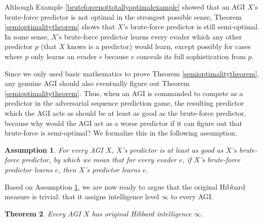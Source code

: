 \documentclass{article}
\newtheorem{theorem}{Theorem}
\newtheorem{assumption}[theorem]{Assumption}
\begin{document}
Although Example \ref{bruteforcenottotallyoptimalexample} showed that
an AGI $X$'s brute-force predictor
is not optimal in the strongest possible sense, Theorem \ref{semioptimalitytheorem}
shows that $X$'s brute-force predictor is still semi-optimal. In some sense,
$X$'s brute-force predictor learns every evader which any other predictor $p$ (that $X$
knows is a predictor) would learn, except possibly for cases where $p$ only learns
an evader $e$ because $e$ conceals its full sophistication from $p$.

Since we only used basic mathematics to prove Theorem \ref{semioptimalitytheorem},
any genuine AGI should also eventually figure out Theorem \ref{semioptimalitytheorem}.
Thus, when an AGI is commanded to compete as a predictor in the adversarial
sequence prediction game, the resulting predictor which the AGI acts as should be
at least as good as the brute-force predictor, because why would the AGI act as
a worse predictor if it can figure out that brute-force is semi-optimal?
We formalize this in the following assumption.

\begin{assumption}
\label{bruteforceassumption}
    For every AGI $X$, $X$'s predictor is at least as good as
    $X$'s brute-force predictor, by which we mean that for every evader $e$,
    if $X$'s brute-force predictor learns $e$, then $X$'s predictor
    learns $e$.
\end{assumption}

Based on Assumption \ref{bruteforceassumption},
we are now ready to argue that the original Hibbard measure is
trivial: that it assigns intelligence level $\infty$ to every AGI.

\begin{theorem}
    Every AGI $X$ has original Hibbard intelligence $\infty$.
\end{theorem}
\end{document}
